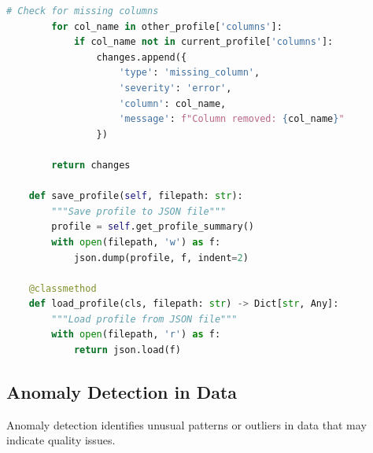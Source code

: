 \begin{lstlisting}[language=Python, caption=Comprehensive Data Profiling Framework]
        # Check for missing columns
        for col_name in other_profile['columns']:
            if col_name not in current_profile['columns']:
                changes.append({
                    'type': 'missing_column',
                    'severity': 'error',
                    'column': col_name,
                    'message': f"Column removed: {col_name}"
                })

        return changes

    def save_profile(self, filepath: str):
        """Save profile to JSON file"""
        profile = self.get_profile_summary()
        with open(filepath, 'w') as f:
            json.dump(profile, f, indent=2)

    @classmethod
    def load_profile(cls, filepath: str) -> Dict[str, Any]:
        """Load profile from JSON file"""
        with open(filepath, 'r') as f:
            return json.load(f)
\end{lstlisting}

\subsection{Anomaly Detection in Data}

Anomaly detection identifies unusual patterns or outliers in data that may indicate quality issues.

